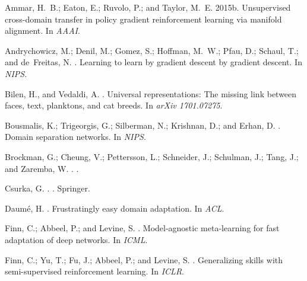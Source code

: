 \documentclass[letterpaper]{article} \usepackage{aaai18}  \usepackage{times}  \usepackage{helvet}  \usepackage{courier}  \usepackage{url}  \usepackage{graphicx}  \usepackage{amsmath}
\begin{document}
{{\begin{thebibliography}{}
Ammar, H.~B.; Eaton, E.; Ruvolo, P.; and Taylor, M.~E.
\newblock 2015b.
\newblock Unsupervised cross-domain transfer in policy gradient reinforcement
  learning via manifold alignment.
\newblock In {\em AAAI}.

Andrychowicz, M.; Denil, M.; Gomez, S.; Hoffman, M.~W.; Pfau, D.; Schaul, T.;
  and de~Freitas, N.
.
\newblock Learning to learn by gradient descent by gradient descent.
\newblock In {\em NIPS}.

Bilen, H., and Vedaldi, A.
.
\newblock Universal representations: The missing link between faces, text,
  planktons, and cat breeds.
\newblock In {\em arXiv 1701.07275}.

Bousmalis, K.; Trigeorgis, G.; Silberman, N.; Krishnan, D.; and Erhan, D.
.
\newblock Domain separation networks.
\newblock In {\em NIPS}.

Brockman, G.; Cheung, V.; Pettersson, L.; Schneider, J.; Schulman, J.; Tang,
  J.; and Zaremba, W.
.
.

Csurka, G.
.
.
\newblock Springer.

Daum{\'e}, H.
.
\newblock Frustratingly easy domain adaptation.
\newblock In {\em ACL}.

Finn, C.; Abbeel, P.; and Levine, S.
.
\newblock Model-agnostic meta-learning for fast adaptation of deep networks.
\newblock In {\em ICML}.

Finn, C.; Yu, T.; Fu, J.; Abbeel, P.; and Levine, S.
.
\newblock Generalizing skills with semi-supervised reinforcement learning.
\newblock In {\em ICLR}.


\end{thebibliography}}}
\end{document}

